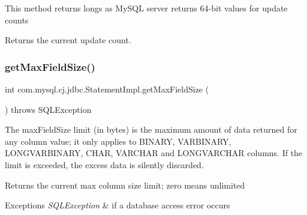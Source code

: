 This method returns longs as My\+S\+QL server returns 64-\/bit values for update counts 

\begin{DoxyReturn}{Returns}
the current update count. 
\end{DoxyReturn}
\mbox{\label{classcom_1_1mysql_1_1cj_1_1jdbc_1_1_statement_impl_a1dbdd8b00e13cbaadf54920e8d93075d}} 
\subsubsection{\texorpdfstring{get\+Max\+Field\+Size()}{getMaxFieldSize()}}
{\footnotesize\ttfamily int com.\+mysql.\+cj.\+jdbc.\+Statement\+Impl.\+get\+Max\+Field\+Size (\begin{DoxyParamCaption}{ }\end{DoxyParamCaption}) throws S\+Q\+L\+Exception}

The max\+Field\+Size limit (in bytes) is the maximum amount of data returned for any column value; it only applies to B\+I\+N\+A\+RY, V\+A\+R\+B\+I\+N\+A\+RY, L\+O\+N\+G\+V\+A\+R\+B\+I\+N\+A\+RY, C\+H\+AR, V\+A\+R\+C\+H\+AR and L\+O\+N\+G\+V\+A\+R\+C\+H\+AR columns. If the limit is exceeded, the excess data is silently discarded.

\begin{DoxyReturn}{Returns}
the current max column size limit; zero means unlimited
\end{DoxyReturn}

\begin{DoxyExceptions}{Exceptions}
{\em S\+Q\+L\+Exception} & if a database access error occurs \\
\hline
\end{DoxyExceptions}
\mbox{\label{classcom_1_1mysql_1_1cj_1_1jdbc_1_1_statement_impl_ae2447bc18fbb4aba8ef64f48f0c90c36}} 
